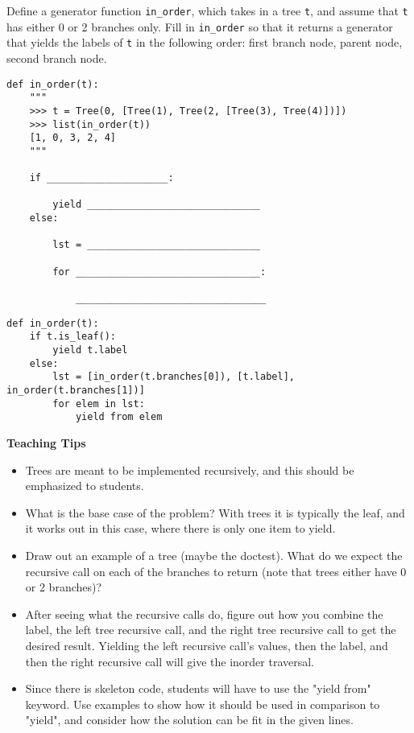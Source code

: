 \begin{blocksection}
\question
Define a generator function \lstinline{in_order}, which takes in a tree \lstinline{t}, and assume that \lstinline{t} has either 0 or 2 branches only. Fill in \lstinline{in_order} so that it returns a generator that yields the labels of \lstinline{t} in the following order: first branch node, parent node, second branch node.

\begin{lstlisting}
def in_order(t):
    """
    >>> t = Tree(0, [Tree(1), Tree(2, [Tree(3), Tree(4)])])
    >>> list(in_order(t))
    [1, 0, 3, 2, 4]
    """

    if _____________________:

        yield ______________________________
    else:

        lst = ______________________________

        for ________________________________:

            _________________________________
\end{lstlisting}
\end{blocksection}

\begin{blocksection}
\begin{solution}
\begin{lstlisting}
def in_order(t):
    if t.is_leaf():
        yield t.label
    else:
        lst = [in_order(t.branches[0]), [t.label], in_order(t.branches[1])]
        for elem in lst:
            yield from elem
\end{lstlisting}
\end{solution}
\end{blocksection}

\begin{guide}
\begin{blocksection}
\textbf{Teaching Tips}
    \begin{itemize}
    \item Trees are meant to be implemented recursively, and this should be emphasized to students.
    \item What is the base case of the problem? With trees it is typically the leaf, and it works out in this case, where there is only one item to yield.
    \item Draw out an example of a tree (maybe the doctest). What do we expect the recursive call on each of the branches to return (note that trees either have 0 or 2 branches)?
    \item After seeing what the recursive calls do, figure out how you combine the label, the left tree recursive call, and the right tree recursive call to get the desired result. Yielding the left recursive call's values, then the label, and then the right recursive call will give the inorder traversal.
    \item Since there is skeleton code, students will have to use the "yield from" keyword. Use examples to show how it should be used in comparison to "yield", and consider how the solution can be fit in the given lines.
    \end{itemize}
\end{blocksection}
\end{guide}